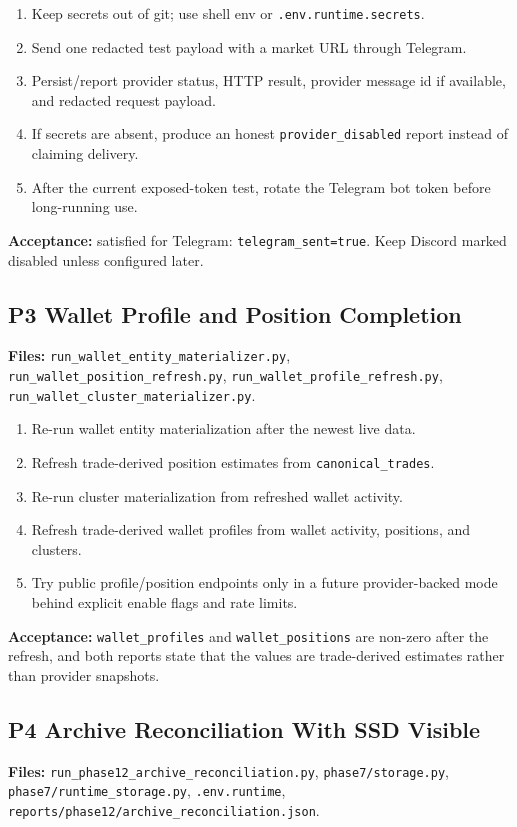 \documentclass{article}
\begin{document}
\begin{enumerate}[nosep]
\item Keep secrets out of git; use shell env or \texttt{.env.runtime.secrets}.
\item Send one redacted test payload with a market URL through Telegram.
\item Persist/report provider status, HTTP result, provider message id if available, and redacted request payload.
\item If secrets are absent, produce an honest \texttt{provider\_disabled} report instead of claiming delivery.
\item After the current exposed-token test, rotate the Telegram bot token before long-running use.
\end{enumerate}

\textbf{Acceptance:} satisfied for Telegram: \texttt{telegram\_sent=true}. Keep Discord marked disabled unless configured later.

\subsection*{P3 Wallet Profile and Position Completion}
\textbf{Files:} \texttt{run\_wallet\_entity\_materializer.py}, \texttt{run\_wallet\_position\_refresh.py}, \texttt{run\_wallet\_profile\_refresh.py}, \texttt{run\_wallet\_cluster\_materializer.py}.

\begin{enumerate}[nosep]
\item Re-run wallet entity materialization after the newest live data.
\item Refresh trade-derived position estimates from \texttt{canonical\_trades}.
\item Re-run cluster materialization from refreshed wallet activity.
\item Refresh trade-derived wallet profiles from wallet activity, positions, and clusters.
\item Try public profile/position endpoints only in a future provider-backed mode behind explicit enable flags and rate limits.
\end{enumerate}

\textbf{Acceptance:} \texttt{wallet\_profiles} and \texttt{wallet\_positions} are non-zero after the refresh, and both reports state that the values are trade-derived estimates rather than provider snapshots.

\subsection*{P4 Archive Reconciliation With SSD Visible}
\textbf{Files:} \texttt{run\_phase12\_archive\_reconciliation.py}, \texttt{phase7/storage.py}, \texttt{phase7/runtime\_storage.py}, \texttt{.env.runtime}, \texttt{reports/phase12/archive\_reconciliation.json}.
\end{document}
